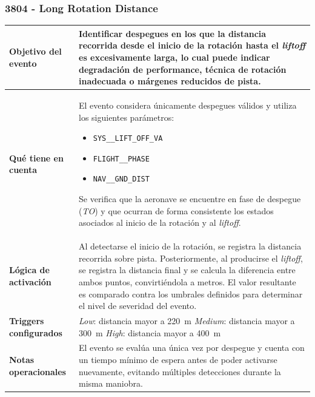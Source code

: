 \documentclass[11pt,a4paper]{article}
\begin{document}
	\subsubsection{3804 - Long Rotation Distance}
	\begin{table}[h!]
		\centering
		\renewcommand{\arraystretch}{1.3}
		\begin{tabular}{p{5cm} p{9.5cm}}
			\hline
			\textbf{Objetivo del evento} &
			Identificar despegues en los que la distancia recorrida desde el inicio de la rotación hasta el \textit{liftoff} es excesivamente larga, lo cual puede indicar degradación de performance, técnica de rotación inadecuada o márgenes reducidos de pista. \\
			\hline
			\textbf{Qué tiene en cuenta} &
			El evento considera únicamente despegues válidos y utiliza los siguientes parámetros:
			\begin{itemize}
				\item \texttt{SYS\_\_LIFT\_OFF\_VA}
				\item \texttt{FLIGHT\_\_PHASE}
				\item \texttt{NAV\_\_GND\_DIST}
			\end{itemize}
			Se verifica que la aeronave se encuentre en fase de despegue (\textit{TO}) y que ocurran de forma consistente los estados asociados al inicio de la rotación y al \textit{liftoff}. \\
			\hline
			\textbf{Lógica de activación} &
			Al detectarse el inicio de la rotación, se registra la distancia recorrida sobre pista. Posteriormente, al producirse el \textit{liftoff}, se registra la distancia final y se calcula la diferencia entre ambos puntos, convirtiéndola a metros. El valor resultante es comparado contra los umbrales definidos para determinar el nivel de severidad del evento. \\
			\hline
			\textbf{Triggers configurados} &
			\textit{Low}: distancia mayor a \SI{220}{\meter} \newline
			\textit{Medium}: distancia mayor a \SI{300}{\meter} \newline
			\textit{High}: distancia mayor a \SI{400}{\meter} \\
			\hline
			\textbf{Notas operacionales} &
			El evento se evalúa una única vez por despegue y cuenta con un tiempo mínimo de espera antes de poder activarse nuevamente, evitando múltiples detecciones durante la misma maniobra. \\
			\hline
		\end{tabular}
	\end{table}
	
\end{document}
